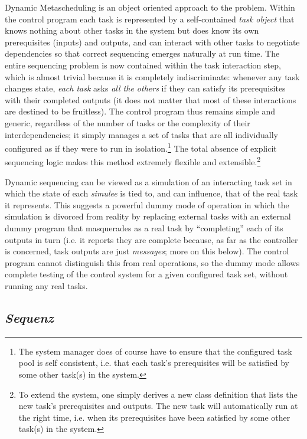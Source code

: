 \documentclass[11pt,a4paper]{article}
\begin{document}
Dynamic Metascheduling is an object oriented approach to the problem.
Within the control program each task is represented by a self-contained
{\em task object} that knows nothing about other tasks in the system but
does know its own prerequisites (inputs) and outputs, and can interact
with other tasks to negotiate dependencies so that correct sequencing
emerges naturally at run time.  The entire sequencing problem is now
contained within the task interaction step, which is almost trivial
because it is completely indiscriminate: whenever any task changes
state, {\em each task} asks {\em all the others} if they can satisfy its
prerequisites with their completed outputs (it does not matter that most
of these interactions are destined to be fruitless). The control program
thus remains simple and generic, regardless of the number of tasks or
the complexity of their interdependencies; it simply manages a set of
tasks that are all individually configured as if they were to run in
isolation.\footnote{The system manager does of course have to ensure
that the configured task pool is self consistent, i.e. that each task's
prerequisites will be satisfied by some other task(s) in the system.}
The total absence of explicit sequencing logic makes this method
extremely flexible and extensible.\footnote{To extend the system, one
simply derives a new class definition that lists the new task's
prerequisites and outputs. The new task will automatically run at the
right time, i.e. when its prerequisites have been satisfied by some
other task(s) in the system.}

Dynamic sequencing can be viewed as a simulation of an interacting task
set in which the state of each {\em simulee} is tied to, and can
influence, that of the real task it represents.  This suggests a
powerful dummy mode of operation in which the simulation is divorced
from reality by replacing external tasks with an external dummy program
that masquerades as a real task by ``completing'' each of its outputs in
turn (i.e. it reports they are complete because, as far as the
controller is concerned, task outputs are just {\em messages}; more on
this below).  The control program cannot distinguish this from real
operations, so the dummy mode allows complete testing of the control
system for a given configured task set, without running any real tasks.


\subsection{{\em Sequenz}}
\end{document}
